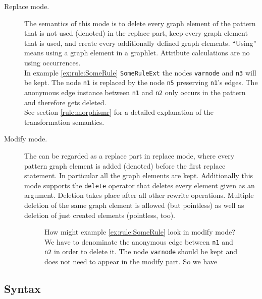\begin{description}
  \item[Replace mode.] The semantics of this mode is to delete every graph element of the pattern that is not used (denoted) in the replace part, keep every graph element that is used, and create every additionally defined graph elements. ``Using'' means using a graph element in a graphlet. Attribute calculations are no using occurrences.\\
  In example \ref{ex:rule:SomeRule} \texttt{SomeRuleExt} the nodes \texttt{varnode} and \texttt{n3} will be kept. The node \texttt{n1} is replaced by the node \texttt{n5} preserving \texttt{n1}'s edges. The anonymous edge instance between \texttt{n1} and \texttt{n2} only occurs in the pattern and therefore gets deleted.\\
See section \ref{rule:morphismr} for a detailed explanation of the transformation semantics. 
  \item[Modify mode.] The  can be regarded as a replace part in replace mode, where every pattern graph element is added (denoted) before the first replace statement. 
In particular all the  graph elements are kept. 
Additionally this mode supports the \texttt{delete} operator that deletes every element given as an argument. 
Deletion takes place after all other rewrite operations. Multiple deletion of the same graph element is allowed (but pointless) as well as deletion of just created elements (pointless, too).
\begin{figure}[htbp]
\begin{example}
How might example \ref{ex:rule:SomeRule} look in modify mode? 
We have to denominate the anonymous edge between \texttt{n1} and \texttt{n2} in order to delete it. 
The node \texttt{varnode} should be kept and does not need to appear in the modify part. 
So we have
\begin{grgen}
rule SomeRuleExtModify(varnode: Node): (Node, EdgeTypeB)  {
  pattern {
    ...
    n1 -e0:Edge-> n2;
    ...
  }
  modify {
    n5 : NodeTypeC<n1>;
    n3 -e1:EdgeTypeB-> n5;
    delete(e0);
    eval {
      ...
\end{grgen}
\end{example}
\end{figure}
\end{description}

\subsection{Syntax}

